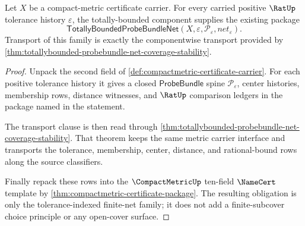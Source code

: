 \begin{theorem}
\label{thm:compactmetric-probe-net-family-obligation}
Let $X$ be a compact-metric certificate carrier. For every carried positive
$\RatUp$ tolerance history $\varepsilon$, the totally-bounded component supplies
the existing package
$$
\mathsf{TotallyBoundedProbeBundleNet}(X,\varepsilon,\mathcal{P}_{\varepsilon},net_{\varepsilon}).
$$
Transport of this family is exactly the componentwise transport provided by
\autoref{thm:totallybounded-probebundle-net-coverage-stability}.
\end{theorem}
\begin{proof}
Unpack the second field of \autoref{def:compactmetric-certificate-carrier}. For
each positive tolerance history it gives a closed $\mathsf{ProbeBundle}$ spine
$\mathcal{P}_{\varepsilon}$, center histories, membership rows, distance
witnesses, and $\RatUp$ comparison ledgers in the package named in the
statement.

The transport clause is then read through
\autoref{thm:totallybounded-probebundle-net-coverage-stability}. That theorem
keeps the same metric carrier interface and transports the tolerance,
membership, center, distance, and rational-bound rows along the source
classifiers.

Finally repack these rows into the $\CompactMetricUp$ ten-field $\NameCert$
template by \autoref{thm:compactmetric-certificate-package}. The resulting
obligation is only the tolerance-indexed finite-net family; it does not add a
finite-subcover choice principle or any open-cover surface.
\end{proof}

